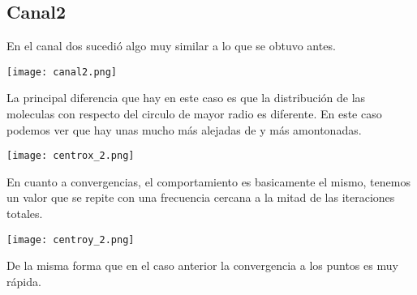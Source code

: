\documentclass[]{article}
\begin{document}
\subsection{Canal2}
En el canal dos sucedi\'o algo muy similar a lo que se obtuvo antes.
\begin{center}
  \texttt{[image: canal2.png]}
\end{center}
La principal diferencia que hay en este caso es que la distribuci\'on de las moleculas con respecto del circulo de mayor radio es diferente. En este caso podemos ver que hay unas mucho m\'as alejadas de y m\'as amontonadas.
\begin{center}
  \texttt{[image: centrox\_2.png]}
\end{center}
En cuanto a convergencias, el comportamiento es basicamente el mismo, tenemos un valor que se repite con una frecuencia cercana a la mitad de las iteraciones totales.
\begin{center}
  \texttt{[image: centroy\_2.png]}
\end{center}
De la misma forma que en el caso anterior la convergencia a los puntos es muy r\'apida.\\
\newpage
\end{document}
